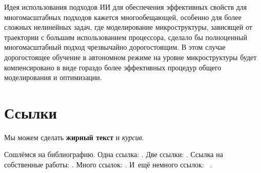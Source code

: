 Идея использования подходов ИИ для обеспечения эффективных свойств для многомасштабных подходов кажется многообещающей, особенно для более сложных нелинейных задач, где моделирование микроструктуры, зависящей от траектории с большим использованием процессора, сделало бы полноценный многомасштабный подход чрезвычайно дорогостоящим. В этом случае дорогостоящее обучение в автономном режиме на уровне микроструктуры будет компенсировано в виде гораздо более эффективных процедур общего моделирования и оптимизации.






\section{Ссылки}\label{sec:ch1/sec2}

Мы можем сделать \textbf{жирный текст} и \textit{курсив}.

Сошлёмся на библиографию.
Одна ссылка: \cite[с.~54]{Sokolov}\cite[с.~36]{Gaidaenko}.
Две ссылки: \cite{Sokolov,Gaidaenko}.
Ссылка на собственные работы: \cite{vakbib1, confbib2}.
Много ссылок: %
\cite{Lermontov, Management, Borozda, Marketing, Constitution, FamilyCode,
    Gost.7.0.53, Razumovski, Lagkueva, Pokrovski, Methodology, Berestova,
    Kriger}%
%
.
И~ещё немного ссылок:~\cite{Article,Book,Booklet,Conference,Inbook,Incollection,Manual,Mastersthesis,
    Misc,Phdthesis,Proceedings,Techreport,Unpublished}
\cite{medvedev2006jelektronnye, CEAT:CEAT581, doi:10.1080/01932691.2010.513279,
    Gosele1999161,Li2007StressAnalysis, Shoji199895, test:eisner-sample,
    test:eisner-sample-shorted, AB_patent_Pomerantz_1968, iofis_patent1960}%
%
.

